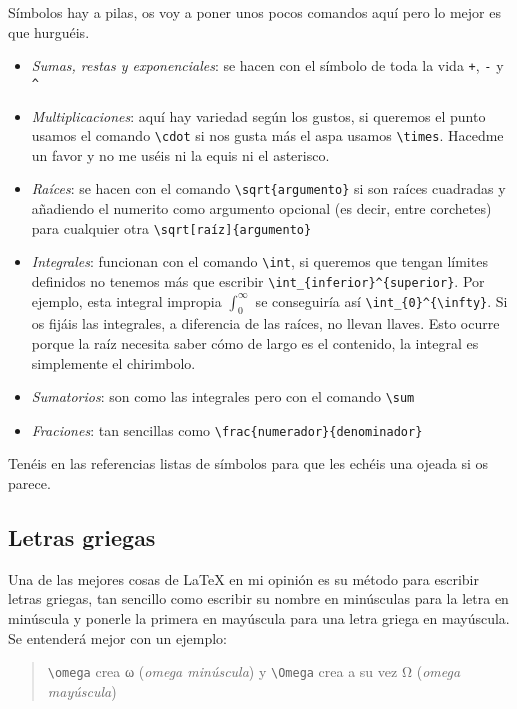 Símbolos hay a pilas, os voy a poner unos pocos comandos aquí pero lo
mejor es que hurguéis.

\begin{itemize}
\item
  \emph{Sumas, restas y exponenciales}: se hacen con el símbolo de toda
  la vida \lstinline!+!, \lstinline!-! y \lstinline!^!
\item
  \emph{Multiplicaciones}: aquí hay variedad según los gustos, si
  queremos el punto usamos el comando \lstinline!\cdot! si nos gusta más
  el aspa usamos \lstinline!\times!. Hacedme un favor y no me uséis ni
  la equis ni el asterisco.
\item
  \emph{Raíces}: se hacen con el comando \lstinline!\sqrt{argumento}! si
  son raíces cuadradas y añadiendo el numerito como argumento opcional
  (es decir, entre corchetes) para cualquier otra
  \lstinline!\sqrt[raíz]{argumento}!
\item
  \emph{Integrales}: funcionan con el comando \lstinline!\int!, si
  queremos que tengan límites definidos no tenemos más que escribir
  \lstinline!\int_{inferior}^{superior}!. Por ejemplo, esta integral
  impropia \(\int_{0}^{\infty}\) se conseguiría así
  \lstinline!\int_{0}^{\infty}!. Si os fijáis las integrales, a
  diferencia de las raíces, no llevan llaves. Esto ocurre porque la raíz
  necesita saber cómo de largo es el contenido, la integral es
  simplemente el chirimbolo.
\item
  \emph{Sumatorios}: son como las integrales pero con el comando
  \lstinline!\sum!
\item
  \emph{Fraciones}: tan sencillas como
  \lstinline!\frac{numerador}{denominador}!
\end{itemize}

Tenéis en las referencias listas de símbolos para que les echéis una
ojeada si os parece.

\subsection{Letras griegas}\label{sec:letrasGriegas}

Una de las mejores cosas de LaTeX en mi opinión es su método para
escribir letras griegas, tan sencillo como escribir su nombre en
minúsculas para la letra en minúscula y ponerle la primera en mayúscula
para una letra griega en mayúscula. Se entenderá mejor con un ejemplo:

\begin{quote}
\lstinline!\omega! crea ω (\emph{omega minúscula}) y \lstinline!\Omega!
crea a su vez Ω (\emph{omega mayúscula})
\end{quote}

